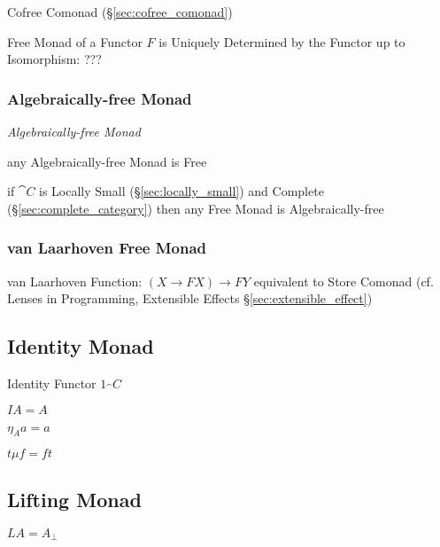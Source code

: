 Cofree Comonad (\S\ref{sec:cofree_comonad})

Free Monad of a Functor $F$ is Uniquely Determined by the Functor up
to Isomorphism: ??? %



\subsubsection{Algebraically-free Monad}\label{sec:algebraically_free}

\emph{Algebraically-free Monad}

any Algebraically-free Monad is Free

if $\cat{C}$ is Locally Small (\S\ref{sec:locally_small}) and Complete
(\S\ref{sec:complete_category}) then any Free Monad is
Algebraically-free



\subsubsection{van Laarhoven Free Monad}
\label{sec:vanlaarhoven_free_monad}

van Laarhoven Function: $(X \rightarrow F X) \rightarrow F Y$
equivalent to Store Comonad (cf. Lenses in Programming, Extensible
Effects \S\ref{sec:extensible_effect})



\subsection{Identity Monad}\label{sec:identity_monad}

Identity Functor $1_\cat{C}$

$I A = A$

$\eta_A a = a$

$t \mu f = f t$



\subsection{Lifting Monad}\label{sec:lifting_monad}

$L A = A_\bot$




